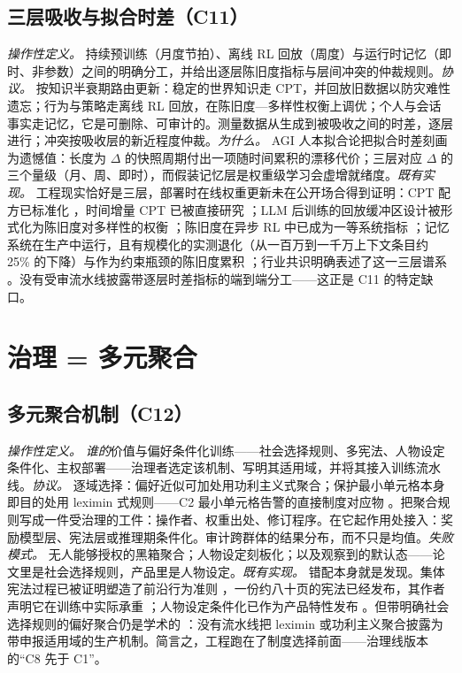 \documentclass[10pt,fontset=fandol]{ctexart}
\begin{document}
\subsection{三层吸收与拟合时差（C11）}

\emph{操作性定义。} 持续预训练（月度节拍）、离线 RL 回放（周度）与运行时记忆（即时、非参数）之间的明确分工，并给出逐层陈旧度指标与层间冲突的仲裁规则。\emph{协议。} 按知识半衰期路由更新：稳定的世界知识走 CPT，并回放旧数据以防灾难性遗忘；行为与策略走离线 RL 回放，在陈旧度—多样性权衡上调优；个人与会话事实走记忆，它是可删除、可审计的。测量数据从生成到被吸收之间的时差，逐层进行；冲突按吸收层的新近程度仲裁。\emph{为什么。} AGI 人本拟合论把拟合时差刻画为遗憾值：长度为 $\Delta$ 的快照周期付出一项随时间累积的漂移代价；三层对应 $\Delta$ 的三个量级（月、周、即时），而假装记忆层是权重级学习会虚增就绪度。\emph{既有实现。} 工程现实恰好是三层，部署时在线权重更新未在公开场合得到证明：CPT 配方已标准化 \cite{ref45,ref46}，时间增量 CPT 已被直接研究 \cite{ref47}；LLM 后训练的回放缓冲区设计被形式化为陈旧度对多样性的权衡 \cite{ref48}；陈旧度在异步 RL 中已成为一等系统指标 \cite{ref49}；记忆系统在生产中运行，且有规模化的实测退化（从一百万到一千万上下文条目约 25\% 的下降）与作为约束瓶颈的陈旧度累积 \cite{ref50}；行业共识明确表述了这一三层谱系 \cite{ref51}。没有受审流水线披露带逐层时差指标的端到端分工——这正是 C11 的特定缺口。

\section{治理 = 多元聚合}

\subsection{多元聚合机制（C12）}

\emph{操作性定义。} \emph{谁的}价值与偏好条件化训练——社会选择规则、多宪法、人物设定条件化、主权部署——治理者选定该机制、写明其适用域，并将其接入训练流水线。\emph{协议。} 逐域选择：偏好近似可加处用功利主义式聚合；保护最小单元格本身即目的处用 leximin 式规则——C2 最小单元格告警的直接制度对应物 \cite{ref52}。把聚合规则写成一件受治理的工件：操作者、权重出处、修订程序。在它起作用处接入：奖励模型层、宪法层或推理期条件化。审计跨群体的结果分布，而不只是均值。\emph{失败模式。} 无人能够授权的黑箱聚合；人物设定刻板化；以及观察到的默认态——论文里是社会选择规则，产品里是人物设定。\emph{既有实现。} 错配本身就是发现。集体宪法过程已被证明塑造了前沿行为准则 \cite{ref53}，一份约八十页的宪法已经发布，其作者声明它在训练中实际承重 \cite{ref54}；人物设定条件化已作为产品特性发布 \cite{ref55}。但带明确社会选择规则的偏好聚合仍是学术的 \cite{ref52}：没有流水线把 leximin 或功利主义聚合披露为带申报适用域的生产机制。简言之，工程跑在了制度选择前面——治理线版本的“C8 先于 C1”。
\end{document}

